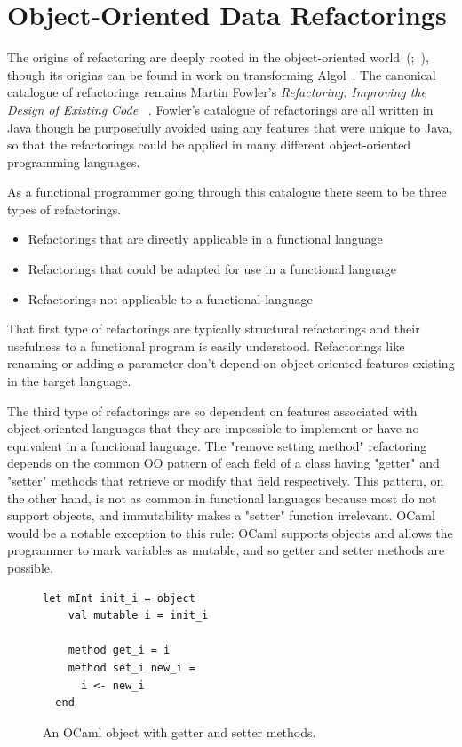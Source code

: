 \section{Object-Oriented Data Refactorings}\label{ooRefs}

The origins of refactoring are deeply rooted in the object-oriented world~(\cite{programRestructuring};~\cite{refactOOFrameworks}), though its origins can be found in work on transforming Algol~\citep{recursiveTransformation}. The canonical catalogue of refactorings remains Martin Fowler's \emph{Refactoring: Improving the Design of Existing Code} ~\citep{fowler}. Fowler's catalogue of refactorings are all written in Java though he purposefully avoided using any features that were unique to Java, so that the refactorings could be applied in many different object-oriented programming languages.

As a functional programmer going through this catalogue there seem to be three types of refactorings.

\begin{itemize}
	\item Refactorings that are directly applicable in a functional language
	\item Refactorings that could be adapted for use in a functional language
	\item Refactorings not applicable to a functional language
\end{itemize}

That first type of refactorings are typically structural refactorings and their usefulness to a functional program is easily understood. Refactorings like renaming or adding a parameter don't depend on object-oriented features existing in the target language.

The third type of refactorings are so dependent on features associated with object-oriented languages that they are impossible to implement or have no equivalent in a functional language. The "remove setting method" refactoring depends on the common OO pattern of each field of a class having "getter" and "setter" methods that retrieve or modify that field respectively. This pattern, on the other hand, is not as common in functional languages because most do not support objects, and immutability makes a "setter" function irrelevant. OCaml would be a notable exception to this rule: OCaml supports objects and allows the programmer to mark variables as mutable, and so getter and setter methods are possible.

\begin{figure}[t]
\begin{lstlisting}[language=caml, morekeywords={object,method}]
let mInt init_i = object
    val mutable i = init_i

    method get_i = i
    method set_i new_i =
      i <- new_i
  end
\end{lstlisting}
\caption{An OCaml object with getter and setter methods.}
\label{ocamlObj}
\end{figure}

